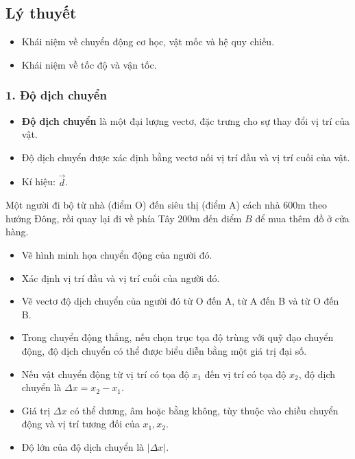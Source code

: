 

\subsection{Lý thuyết}

\begin{emdahoc}
\begin{itemize}
    \item Khái niệm về chuyển động cơ học, vật mốc và hệ quy chiếu.
    \item Khái niệm về tốc độ và vận tốc.
\end{itemize}
\end{emdahoc}

\subsubsection{1. Độ dịch chuyển}

\begin{kienthuc}
\begin{itemize}
    \item \textbf{Độ dịch chuyển} là một đại lượng vectơ, đặc trưng cho sự thay đổi vị trí của vật.
    \item Độ dịch chuyển được xác định bằng vectơ nối vị trí đầu và vị trí cuối của vật.
    \item Kí hiệu: $\vec{d}$.
\end{itemize}
\end{kienthuc}

\begin{hoatdong}
Một người đi bộ từ nhà (điểm O) đến siêu thị (điểm A) cách nhà $600 \text{m}$ theo hướng Đông, rồi quay lại đi về phía Tây $200 \text{m}$ đến điểm $B$ để mua thêm đồ ở cửa hàng.
\begin{itemize}
    \item Vẽ hình minh họa chuyển động của người đó.
    \item Xác định vị trí đầu và vị trí cuối của người đó.
    \item Vẽ vectơ độ dịch chuyển của người đó từ O đến A, từ A đến B và từ O đến B.
\end{itemize}
\end{hoatdong}

\begin{kienthuc}
\begin{itemize}
    \item Trong chuyển động thẳng, nếu chọn trục tọa độ trùng với quỹ đạo chuyển động, độ dịch chuyển có thể được biểu diễn bằng một giá trị đại số.
    \item Nếu vật chuyển động từ vị trí có tọa độ $x_1$ đến vị trí có tọa độ $x_2$, độ dịch chuyển là $\Delta x = x_2 - x_1$.
    \item Giá trị $\Delta x$ có thể dương, âm hoặc bằng không, tùy thuộc vào chiều chuyển động và vị trí tương đối của $x_1, x_2$.
    \item Độ lớn của độ dịch chuyển là $|\Delta x|$.
\end{itemize}
\end{kienthuc}

